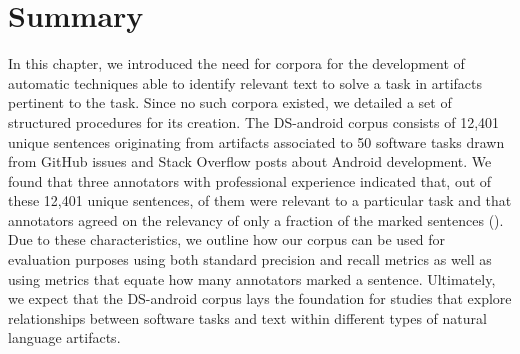 
\section{Summary}
\label{cp4:corpus-summary}

In this chapter, we introduced the need for corpora 
for the development of 
automatic techniques able to identify relevant text
to solve a task in artifacts
pertinent to the task.
Since  no such corpora
existed, we detailed 
a set of structured procedures for its creation. 
The \acs{DS-android} corpus consists of  
12,401 unique sentences
originating from artifacts associated to 50 software tasks
drawn from GitHub issues and Stack Overflow posts about Android development. 
We found that 
three annotators with professional experience indicated that,
out of these 12,401 unique sentences, 
 of them were relevant to a particular task and that 
annotators agreed on the relevancy of  
only a fraction of the marked sentences ().
Due to these characteristics, 
we outline how our corpus can be used for evaluation purposes 
using both standard precision and recall metrics as well as using
metrics that equate how many annotators marked a sentence. 
Ultimately, we expect that the \acs{DS-android} corpus
lays the foundation for studies that explore relationships between software tasks
and text within different types of natural language artifacts.



